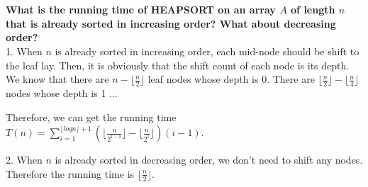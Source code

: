 
\chapter{}
\textbf{
What is the running time of HEAPSORT on an array $A$ of length $n$ that is already sorted in increasing order? What about decreasing order?
}
\hspace*{\fill} \\

1. When $n$ is already sorted in increasing order, each mid-node should be shift to the leaf lay. Then, it is obviously that the shift count of each node is its depth. We know that there are $n-\lfloor\frac{n}{2}\rfloor$ leaf nodes whose depth is 0. There are $\lfloor\frac{n}{2}\rfloor-\lfloor\frac{n}{4}\rfloor$ nodes whose depth is 1 ...

Therefore, we can get the running time 
$T(n)=\sum\limits_{i=1}^{\lfloor log n\rfloor+1}(\lfloor\frac{n}{2^{i-1}}\rfloor-\lfloor\frac{n}{2^{i}}\rfloor)(i-1)$. 

2. When $n$ is already sorted in decreasing order, we don't need to shift any nodes. Therefore the running time is $\lfloor\frac{n}{2}\rfloor$.